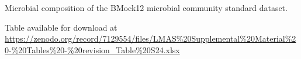 \begin{table}[]
\centering
\caption{Microbial composition of the BMock12 microbial community standard dataset.}
\label{tab:ch5_suptable24}
Table available for download at \url{https://zenodo.org/record/7129554/files/LMAS\%20Supplemental\%20Material\%20-\%20Tables\%20-\%20revision_Table\%20S24.xlsx}
\end{table}